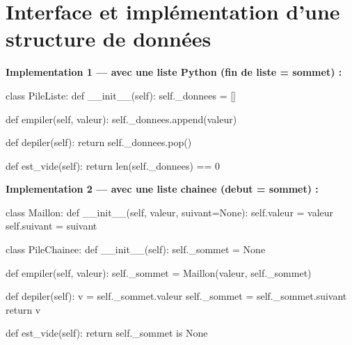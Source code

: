 
\section{Interface et implémentation d'une structure de données}





\textbf{Implementation 1 — avec une liste Python (fin de liste = sommet) :}
\begin{python}
class PileListe:
    def __init__(self):
        self._donnees = []

    def empiler(self, valeur):
        self._donnees.append(valeur)

    def depiler(self):
        return self._donnees.pop()

    def est_vide(self):
        return len(self._donnees) == 0
\end{python}

\textbf{Implementation 2 — avec une liste chainee (debut = sommet) :}
\begin{python}
class Maillon:
    def __init__(self, valeur, suivant=None):
        self.valeur = valeur
        self.suivant = suivant

class PileChainee:
    def __init__(self):
        self._sommet = None

    def empiler(self, valeur):
        self._sommet = Maillon(valeur, self._sommet)

    def depiler(self):
        v = self._sommet.valeur
        self._sommet = self._sommet.suivant
        return v

    def est_vide(self):
        return self._sommet is None
\end{python}

